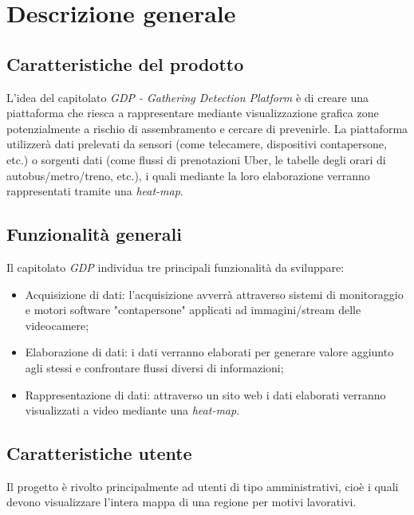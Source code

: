 \chapter{Descrizione generale}
\section{Caratteristiche del prodotto}
L'idea del capitolato \textit{GDP - Gathering Detection Platform} è di creare una piattaforma che riesca a rappresentare mediante visualizzazione grafica zone potenzialmente a rischio di assembramento e cercare di prevenirle.
La piattaforma utilizzerà dati prelevati da sensori (come telecamere, dispositivi contapersone, etc.) o sorgenti dati (come flussi di prenotazioni Uber, le tabelle degli orari di autobus/metro/treno, etc.), i quali mediante la loro elaborazione verranno rappresentati tramite una \textit{heat-map}.

\section{Funzionalità generali}
Il capitolato \textit{GDP} individua tre principali funzionalità da sviluppare:
\begin{itemize}
	\item Acquisizione di dati: l'acquisizione avverrà attraverso sistemi di monitoraggio e motori software "contapersone" applicati ad immagini/stream delle videocamere;
	\item Elaborazione di dati: i dati verranno elaborati per generare valore aggiunto agli stessi e confrontare flussi diversi di informazioni;
	\item Rappresentazione di dati: attraverso un sito web i dati elaborati verranno visualizzati a video mediante una \textit{heat-map}.
\end{itemize}

\section{Caratteristiche utente}
Il progetto è rivolto principalmente ad utenti di tipo amministrativi, cioè i quali devono visualizzare l'intera mappa di una regione per motivi lavorativi.
